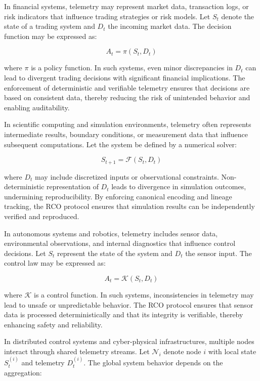 In financial systems, telemetry may represent market data, transaction logs, or risk indicators that influence trading strategies or risk models. Let $S_t$ denote the state of a trading system and $D_t$ the incoming market data. The decision function may be expressed as:

\begin{equation}
A_t = \pi(S_t, D_t)
\end{equation}

where $\pi$ is a policy function. In such systems, even minor discrepancies in $D_t$ can lead to divergent trading decisions with significant financial implications. The enforcement of deterministic and verifiable telemetry ensures that decisions are based on consistent data, thereby reducing the risk of unintended behavior and enabling auditability.

In scientific computing and simulation environments, telemetry often represents intermediate results, boundary conditions, or measurement data that influence subsequent computations. Let the system be defined by a numerical solver:

\begin{equation}
S_{t+1} = \mathcal{F}(S_t, D_t)
\end{equation}

where $D_t$ may include discretized inputs or observational constraints. Non-deterministic representation of $D_t$ leads to divergence in simulation outcomes, undermining reproducibility. By enforcing canonical encoding and lineage tracking, the RCO protocol ensures that simulation results can be independently verified and reproduced.

In autonomous systems and robotics, telemetry includes sensor data, environmental observations, and internal diagnostics that influence control decisions. Let $S_t$ represent the state of the system and $D_t$ the sensor input. The control law may be expressed as:

\begin{equation}
A_t = \mathcal{K}(S_t, D_t)
\end{equation}

where $\mathcal{K}$ is a control function. In such systems, inconsistencies in telemetry may lead to unsafe or unpredictable behavior. The RCO protocol ensures that sensor data is processed deterministically and that its integrity is verifiable, thereby enhancing safety and reliability.

In distributed control systems and cyber-physical infrastructures, multiple nodes interact through shared telemetry streams. Let $\mathcal{N}_i$ denote node $i$ with local state $S_t^{(i)}$ and telemetry $D_t^{(i)}$. The global system behavior depends on the aggregation:

